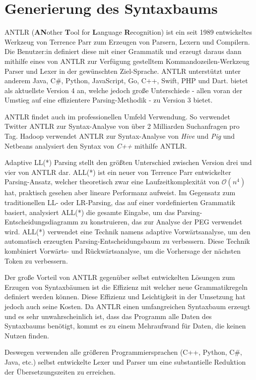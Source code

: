\chapter{Generierung des Syntaxbaums}
\label{cha:antlr}

ANTLR (\textbf{AN}other \textbf{T}ool for \textbf{L}anguage \textbf{R}ecognition) ist ein seit 1989 entwickeltes Werkzeug von Terrence Parr zum Erzeugen von Parsern, Lexern und Compilern. Die Benutzer:in definiert diese mit einer Grammatik und erzeugt daraus dann mithilfe eines von ANTLR zur Verfügung gestelltem Kommandozeilen-Werkzeug Parser und Lexer in der gewünschten Ziel-Sprache. ANTLR unterstützt unter anderem Java, C\#, Python, JavaScript, Go, C++, Swift, PHP und Dart. \toya bietet als aktuellste Version 4 an, welche jedoch große Unterschiede - allen voran der Umstieg auf eine effizientere Parsing-Methodik - zu Version 3 bietet.

ANTLR findet auch im professionellen Umfeld Verwendung. So verwendet Twitter ANTLR zur Syntax-Analyse von über 2 Milliarden Suchanfragen pro Tag. Hadoop verwendet ANTLR zur Syntax-Analyse von \textit{Hive} und \textit{Pig} und Netbeans analysiert den Syntax von \textit{C++} mithilfe ANTLR. 

Adaptive LL(*) Parsing stellt den größten Unterschied zwischen Version drei und vier von ANTLR dar. ALL(*) ist ein neuer von Terrence Parr entwickelter Parsing-Ansatz, welcher theoretisch zwar eine Laufzeitkomplexität von $\mathcal{O}(n^4)$ hat, praktisch gesehen aber lineare Performanz aufweist. Im Gegensatz zum traditionellen LL- oder LR-Parsing, das auf einer vordefinierten Grammatik basiert, analysiert ALL(*) die gesamte Eingabe, um das Parsing-Entscheidungsdiagramm zu konstruieren, das zur Analyse der PEG verwendet wird. ALL(*) verwendet eine Technik namens adaptive Vorwärtsanalyse, um den automatisch erzeugten Parsing-Entscheidungsbaum zu verbessern. Diese Technik kombiniert Vorwärts- und Rückwärtsanalyse, um die Vorhersage der nächsten Token zu verbessern.

Der große Vorteil von ANTLR gegenüber selbst entwickelten Lösungen zum Erzugen von Syntaxbäumen ist die Effizienz mit welcher neue Grammatikregeln definiert werden können. Diese Effizienz und Leichtigkeit in der Umsetzung hat jedoch auch seine Kosten. Da ANTLR einen umfangreichen Syntaxbaum erzeugt und es sehr unwahrscheinlich ist, dass das Programm alle Daten des Syntaxbaums benötigt, kommt es zu einem Mehraufwand für Daten, die keinen Nutzen finden.

Deswegen verwenden alle größeren Programmiersprachen (C++, Python, C\#, Java, etc.) selbst entwickelte Lexer und Parser um eine substantielle Reduktion der Übersetzungszeiten zu erreichen.

